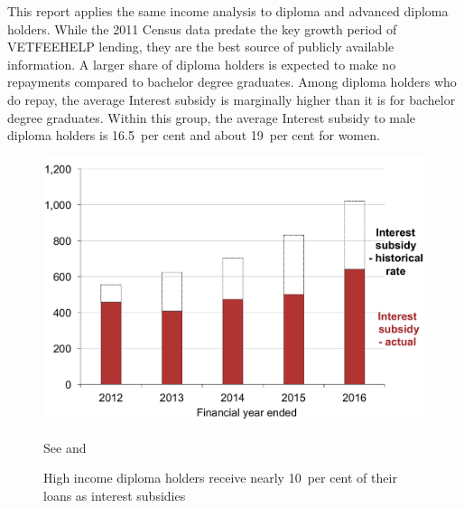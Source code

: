 \documentclass[embargoed]{grattan}
\begin{document}
\protect\hypertarget{_Ref312571851}{}{}This report applies the same income analysis to diploma and advanced diploma holders.
While the 2011 Census data predate the key growth period of \gls{VETFEEHELP} lending, they are the best source of publicly available information.
A larger share of diploma holders is expected to make no repayments compared to bachelor degree graduates.
Among diploma holders who do repay, the average \gls{Interest subsidy} is marginally higher than it is for bachelor degree graduates.
Within this group, the average \gls{Interest subsidy} to male diploma holders is 16.5~per cent and about 19~per cent for women.

\begin{figure}
\caption{High income diploma holders receive nearly 10~per cent of their loans as interest subsidies}\label{fig:fig11-high-income-dip-holders-receive-nearly-10pc-loans-as-interest-subsides}

\includegraphics[page=11]{atlas/Chartpack.pdf}

{See  and \textcite{Ryan2016RedesigningVETFEE}}
\end{figure}
\end{document}
